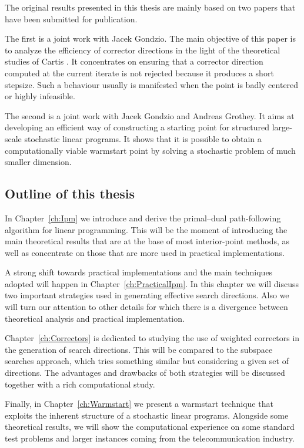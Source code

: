 The original results presented in this thesis are mainly based on two
papers that have been submitted for publication.

The first \cite{ColomboGondzio05} is a joint work with Jacek Gondzio.
The main objective of this paper is to analyze the efficiency of
corrector directions in the light of the theoretical studies of Cartis
\cite{Cartis04,Cartis05}. It concentrates on ensuring that a corrector
direction computed at the current iterate is not rejected because it
produces a short stepsize. Such a behaviour usually is manifested when
the point is badly centered or highly infeasible.

The second \cite{ColomboGondzioGrothey06} is a joint work with
Jacek Gondzio and Andreas Grothey. It aims at developing an
efficient way of constructing a starting point for structured 
large-scale stochastic linear programs.
It shows that it is possible to obtain a computationally viable
warmstart point by solving a stochastic problem of much smaller
dimension.


%
%
\subsection{Outline of this thesis}

In Chapter~\ref{ch:Ipm} we introduce and derive the primal--dual
path-following algorithm for linear programming. This will be
the moment of introducing the main theoretical results that are at
the base of most interior-point methods, as well as concentrate
on those that are more used in practical implementations.

A strong shift towards practical implementations and the main techniques
adopted will happen in Chapter~\ref{ch:PracticalIpm}. In this
chapter we will discuss two important strategies used in generating
effective search directions. Also we will turn our attention
to other details for which there is a divergence between theoretical
analysis and practical implementation.

Chapter~\ref{ch:Correctors} is dedicated to studying the use of
weighted correctors in the generation of search directions. This will
be compared to the subspace searches approach, which tries something
similar but considering a given set of directions. The advantages
and drawbacks of both strategies will be discussed together with
a rich computational study.

Finally, in Chapter~\ref{ch:Warmstart} we present a warmstart technique
that exploits the inherent structure of a stochastic linear programs.
Alongside some theoretical results, we will show the computational
experience on some standard test problems and larger instances coming
from the telecommunication industry.
